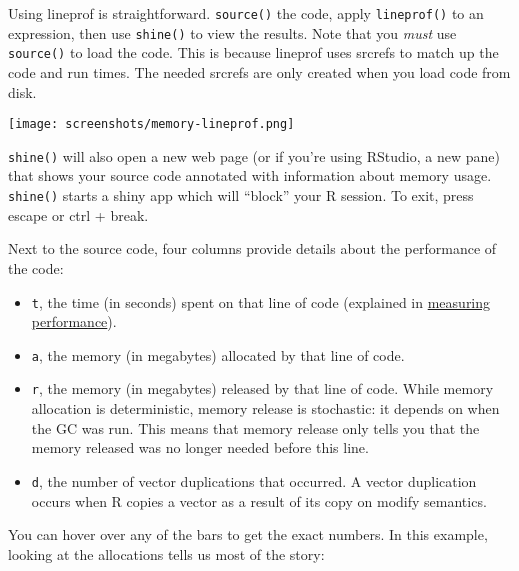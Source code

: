 Using lineprof is straightforward. \texttt{source()} the code, apply
\texttt{lineprof()} to an expression, then use \texttt{shine()} to view
the results. Note that you \emph{must} use \texttt{source()} to load the
code. This is because lineprof uses srcrefs to match up the code and run
times. The needed srcrefs are only created when you load code from disk.

\begin{Shaded}
\begin{Highlighting}[]

\NormalTok{(}\NormalTok{)}
\StringTok{ }\NormalTok{(}\NormalTok{(}\NormalTok{))}
\end{Highlighting}
\end{Shaded}

\texttt{[image: screenshots/memory-lineprof.png]}

\texttt{shine()} will also open a new web page (or if you're using
RStudio, a new pane) that shows your source code annotated with
information about memory usage. \texttt{shine()} starts a shiny app
which will ``block'' your R session. To exit, press escape or ctrl +
break.

Next to the source code, four columns provide details about the
performance of the code:

\begin{itemize}
\item
  \texttt{t}, the time (in seconds) spent on that line of code
  (explained in \protect\hyperlink{measure-perf}{measuring
  performance}).
\item
  \texttt{a}, the memory (in megabytes) allocated by that line of code.
\item
  \texttt{r}, the memory (in megabytes) released by that line of code.
  While memory allocation is deterministic, memory release is
  stochastic: it depends on when the GC was run. This means that memory
  release only tells you that the memory released was no longer needed
  before this line.
\item
  \texttt{d}, the number of vector duplications that occurred. A vector
  duplication occurs when R copies a vector as a result of its copy on
  modify semantics.
\end{itemize}

You can hover over any of the bars to get the exact numbers. In this
example, looking at the allocations tells us most of the story:

